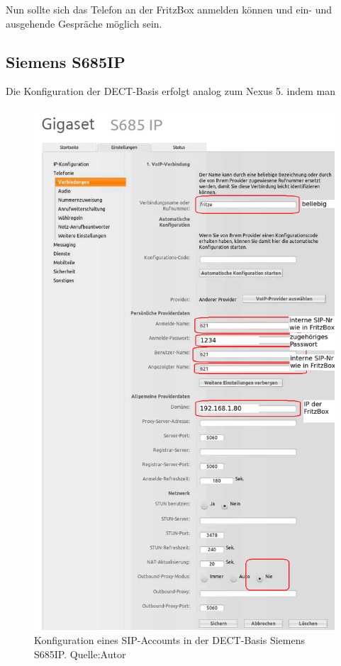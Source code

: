 \documentclass[a4paper,12pt]{scrbook}
\begin{document}
Nun sollte sich das Telefon an der FritzBox anmelden können und ein- und ausgehende Gespräche möglich sein.

\subsection{Siemens S685IP}
Die Konfiguration der DECT-Basis erfolgt analog zum Nexus 5. indem man 

\begin{figure}[H]
\begin{center}
\includegraphics[width=.8\hsize]{./images/voip-client-s685ip-01.png}
\end{center}
\caption[Konfiguration eines SIP-Accounts in der DECT-Basis Siemens S685IP]
{\label{voip-client-nexus5}Konfiguration eines SIP-Accounts in der DECT-Basis Siemens S685IP. Quelle:Autor}
\end{figure}
\end{document}
